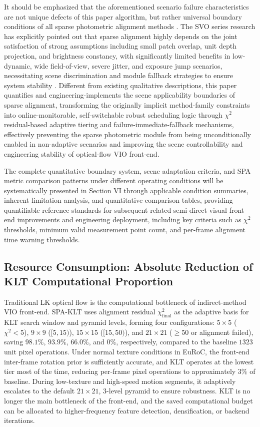 \documentclass[journal,twoside,web]{ieeecolor}
\begin{document}
It should be emphasized that the aforementioned scenario failure characteristics are not unique defects of this paper algorithm, but rather universal boundary conditions of all sparse photometric alignment methods \cite{forster2017svo}. The SVO series research has explicitly pointed out that sparse alignment highly depends on the joint satisfaction of strong assumptions including small patch overlap, unit depth projection, and brightness constancy, with significantly limited benefits in low-dynamic, wide field-of-view, severe jitter, and exposure jump scenarios, necessitating scene discrimination and module fallback strategies to ensure system stability \cite{forster2017svo}. Different from existing qualitative descriptions, this paper quantifies and engineering-implements the scene applicability boundaries of sparse alignment, transforming the originally implicit method-family constraints into online-monitorable, self-switchable robust scheduling logic through $\chi^{2}$ residual-based adaptive tiering and failure-immediate-fallback mechanisms, effectively preventing the sparse photometric module from being unconditionally enabled in non-adaptive scenarios and improving the scene controllability and engineering stability of optical-flow VIO front-end.

The complete quantitative boundary system, scene adaptation criteria, and SPA metric comparison patterns under different operating conditions will be systematically presented in Section VI through applicable condition summaries, inherent limitation analysis, and quantitative comparison tables, providing quantifiable reference standards for subsequent related semi-direct visual front-end improvements and engineering deployment, including key criteria such as $\chi^{2}$ thresholds, minimum valid measurement point count, and per-frame alignment time warning thresholds.

\subsection{Resource Consumption: Absolute Reduction of KLT Computational Proportion}

Traditional LK optical flow is the computational bottleneck of indirect-method VIO front-end. SPA-KLT uses alignment residual $\chi^{2}_{\mathrm{final}}$ as the adaptive basis for KLT search window and pyramid levels, forming four configurations: $5\times5$ ($\chi^{2}<5$), $9\times9$ ($[5,15)$), $15\times15$ ($[15,50)$), and $21\times21$ ($\ge 50$ or alignment failed), saving $98.1\%$, $93.9\%$, $66.0\%$, and $0\%$, respectively, compared to the baseline $1323$ unit pixel operations. Under normal texture conditions in EuRoC, the front-end inter-frame rotation prior is sufficiently accurate, and KLT operates at the lowest tier most of the time, reducing per-frame pixel operations to approximately $3\%$ of baseline. During low-texture and high-speed motion segments, it adaptively escalates to the default $21\times21$, 3-level pyramid to ensure robustness. KLT is no longer the main bottleneck of the front-end, and the saved computational budget can be allocated to higher-frequency feature detection, densification, or backend iterations.
\end{document}
